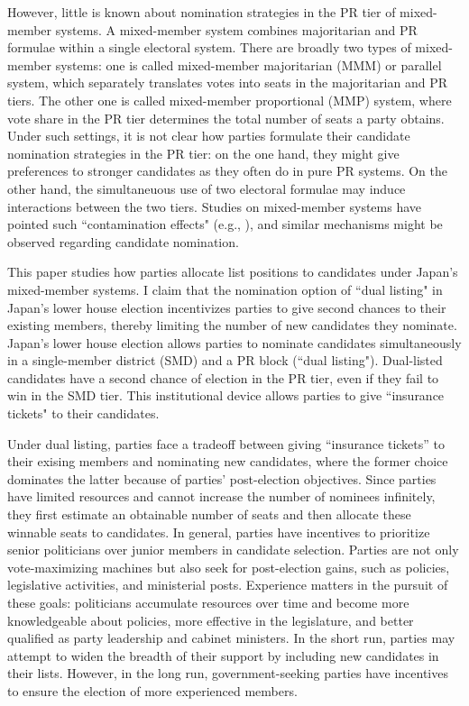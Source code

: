 \documentclass[a4paper, 11pt]{article}
\begin{document}
However, little is known about nomination strategies in the PR tier of mixed-member systems. A mixed-member system combines majoritarian and PR formulae within a single electoral system. There are broadly two types of mixed-member systems: one is called mixed-member majoritarian (MMM) or parallel system, which separately translates votes into seats in the majoritarian and PR tiers. The other one is called mixed-member proportional (MMP) system, where vote share in the PR tier determines the total number of seats a party obtains. Under such settings, it is not clear how parties formulate their candidate nomination strategies in the PR tier: on the one hand, they might give preferences to stronger candidates as they often do in pure PR systems. On the other hand, the simultaneuous use of two electoral formulae may induce interactions between the two tiers. Studies on mixed-member systems have pointed such ``contamination effects" (e.g., \citet{ferrara_mixed_2005}), and similar mechanisms might be observed regarding candidate nomination.  

This paper studies how parties allocate list positions to candidates under Japan's mixed-member systems. I claim that the nomination option of ``dual listing" in Japan's lower house election incentivizes parties to give second chances to their existing members, thereby limiting the number of new candidates they nominate. Japan's lower house election allows parties to nominate candidates simultaneously in a single-member district (SMD) and a PR block (``dual listing"). Dual-listed candidates have a second chance of election in the PR tier, even if they fail to win in the SMD tier. This institutional device allows parties to give ``insurance tickets" to their candidates. 

Under dual listing, parties face a tradeoff between giving “insurance tickets” to their exising members and nominating new candidates, where the former choice dominates the latter because of parties’ post-election objectives. Since parties have limited resources and cannot increase the number of nominees infinitely, they first estimate an obtainable number of seats and then allocate these winnable seats to candidates. In general, parties have incentives to prioritize senior politicians over junior members in candidate selection. Parties are not only vote-maximizing machines but also seek for post-election gains, such as policies, legislative activities, and ministerial posts. Experience matters in the pursuit of these goals: politicians accumulate resources over time and become more knowledgeable about policies, more effective in the legislature, and better qualified as party leadership and cabinet ministers. In the short run, parties may attempt to widen the breadth of their support by including new candidates in their lists. However, in the long run, government-seeking parties have incentives to ensure the election of more experienced members. 
\end{document}
